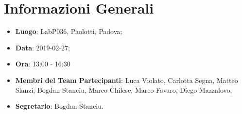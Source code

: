 \section{Informazioni Generali}
\begin{itemize}
	\item \textbf{Luogo}: LabP036, Paolotti, Padova; 
	\item \textbf{Data}: 2019-02-27;
	\item \textbf{Ora}: 13:00 - 16:30
	\item \textbf{Membri del Team Partecipanti}: Luca Violato, Carlotta Segna, Matteo Slanzi, Bogdan Stanciu, Marco Chilese, Marco Favaro, Diego Mazzalovo; 
	\item \textbf{Segretario}: Bogdan Stanciu. 
\end{itemize}


